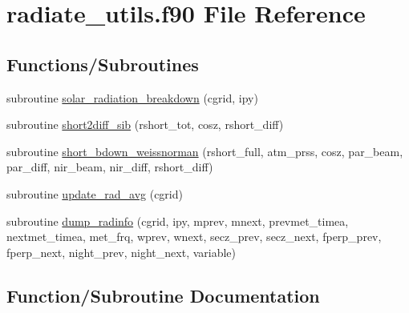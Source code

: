 \hypertarget{radiate__utils_8f90}{}\section{radiate\+\_\+utils.\+f90 File Reference}
\label{radiate__utils_8f90}
\subsection*{Functions/\+Subroutines}
\begin{DoxyCompactItemize}
\item 
subroutine \hyperlink{radiate__utils_8f90_a672952348e79808e2b0f947194522dce}{solar\+\_\+radiation\+\_\+breakdown} (cgrid, ipy)
\item 
subroutine \hyperlink{radiate__utils_8f90_a51dd2852d7a8314141edfffde24dd0af}{short2diff\+\_\+sib} (rshort\+\_\+tot, cosz, rshort\+\_\+diff)
\item 
subroutine \hyperlink{radiate__utils_8f90_aaa2bf8c80651108d909133d3c5bccbf1}{short\+\_\+bdown\+\_\+weissnorman} (rshort\+\_\+full, atm\+\_\+prss, cosz, par\+\_\+beam, par\+\_\+diff, nir\+\_\+beam, nir\+\_\+diff, rshort\+\_\+diff)
\item 
subroutine \hyperlink{radiate__utils_8f90_a08249d25775527a48b4647e648d4b711}{update\+\_\+rad\+\_\+avg} (cgrid)
\item 
subroutine \hyperlink{radiate__utils_8f90_a97b7f489024c93fc8d8dafc943c5deda}{dump\+\_\+radinfo} (cgrid, ipy, mprev, mnext, prevmet\+\_\+timea, nextmet\+\_\+timea, met\+\_\+frq, wprev, wnext, secz\+\_\+prev, secz\+\_\+next, fperp\+\_\+prev, fperp\+\_\+next, night\+\_\+prev, night\+\_\+next, variable)
\end{DoxyCompactItemize}


\subsection{Function/\+Subroutine Documentation}
\mbox{\label{radiate__utils_8f90_a97b7f489024c93fc8d8dafc943c5deda}} 
